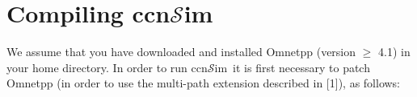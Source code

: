 \documentclass{article}
\newcommand{\ccnsim}{ccn$\mathcal{S}$im}
\begin{document}
\section{Compiling \ccnsim}
We assume that you have downloaded and installed Omnetpp (version $\geq$ 4.1) in
your home directory. In order to run \ccnsim\, it is first necessary to patch
Omnetpp (in order to use the multi-path extension described in [1]), as follows:
\end{document}
